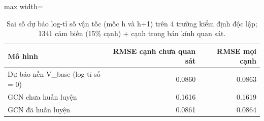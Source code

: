 \begin{table}[!htbp]
\centering
\small
\caption{Sai số dự báo log-tỉ số vận tốc (mốc h và h+1) trên 4 trường kiểm định độc lập; 1341 cảm biến (15\% cạnh) + cạnh trong bán kính quan sát.}
\label{tab:tab_forecast}
\begin{adjustbox}{max width=\linewidth}
\begin{tabular}{lrr}
\toprule
Mô hình & RMSE cạnh chưa quan sát & RMSE mọi cạnh \\
\midrule
Dự báo nền V\_base (log-tỉ số = 0) & 0.0860 & 0.0863 \\
GCN chưa huấn luyện & 0.1616 & 0.1619 \\
GCN đã huấn luyện & 0.0861 & 0.0864 \\
\bottomrule
\end{tabular}
\end{adjustbox}
\end{table}
